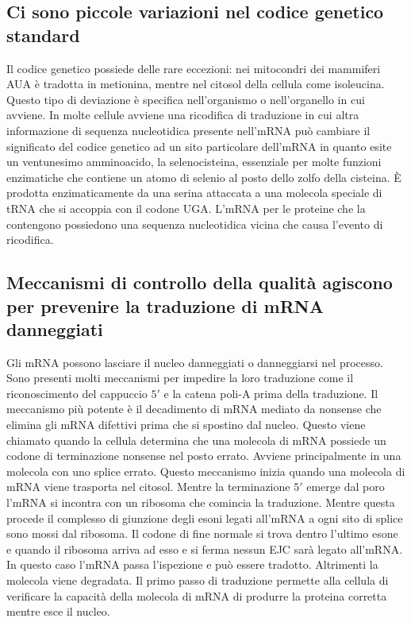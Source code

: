 \subsection{Ci sono piccole variazioni nel codice genetico standard}
Il codice genetico possiede delle rare eccezioni: nei mitocondri dei mammiferi AUA \`e tradotta in metionina, mentre nel citosol della cellula come isoleucina. Questo tipo di deviazione
\`e specifica nell'organismo o nell'organello in cui avviene. In molte cellule avviene una ricodifica di traduzione in cui altra informazione di sequenza nucleotidica presente 
nell'mRNA pu\`o cambiare il significato del codice genetico ad un sito particolare dell'mRNA in quanto esite un ventunesimo amminoacido, la selenocisteina, essenziale per molte funzioni
enzimatiche che contiene un atomo di selenio al posto dello zolfo della cisteina. \`E prodotta enzimaticamente da una serina attaccata a una molecola speciale di tRNA che si accoppia 
con il codone UGA. L'mRNA per le proteine che la contengono possiedono una sequenza nucleotidica vicina che causa l'evento di ricodifica. 
\subsection{Meccanismi di controllo della qualit\`a agiscono per prevenire la traduzione di mRNA danneggiati}
Gli mRNA possono lasciare il nucleo danneggiati o danneggiarsi nel processo. Sono presenti molti meccanismi per impedire la loro traduzione come il riconoscimento del cappuccio $5'$ e 
la catena poli-A prima della traduzione. Il meccanismo pi\`u potente \`e il decadimento di mRNA mediato da nonsense che elimina gli mRNA difettivi prima che si spostino dal nucleo. Questo
viene chiamato quando la cellula determina che una molecola di mRNA possiede un codone di terminazione nonsense nel posto errato. Avviene principalmente in una molecola con uno splice
errato. Questo meccanismo inizia quando una molecola di mRNA viene trasporta nel citosol. Mentre la terminazione $5'$ emerge dal poro l'mRNA si incontra con un ribosoma che comincia 
la traduzione. Mentre questa procede il complesso di giunzione degli esoni legati all'mRNA a ogni sito di splice sono mossi dal ribosoma. Il codone di fine normale si trova dentro 
l'ultimo esone e quando il ribosoma arriva ad esso e si ferma nessun EJC sar\`a legato all'mRNA. In questo caso l'mRNA passa l'ispezione e pu\`o essere tradotto. Altrimenti la molecola
viene degradata. Il primo passo di traduzione permette alla cellula di verificare la capacit\` a della molecola di mRNA di produrre la proteina corretta mentre esce il nucleo. 
